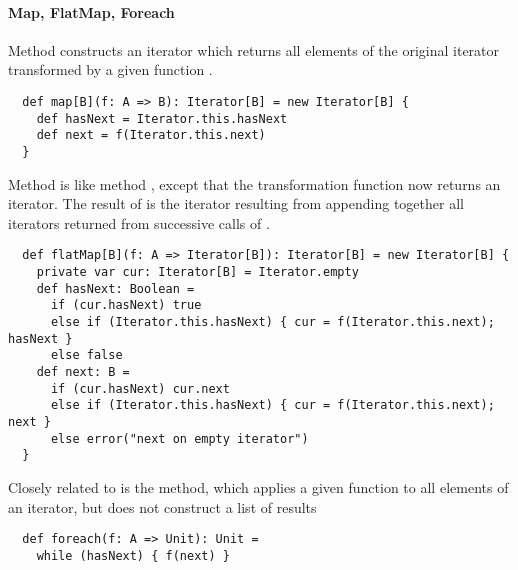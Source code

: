 {\paragraph{Map, FlatMap, Foreach} Method  
constructs an iterator which returns all elements of the original
iterator transformed by a given function .
\begin{lstlisting}
  def map[B](f: A => B): Iterator[B] = new Iterator[B] {
    def hasNext = Iterator.this.hasNext
    def next = f(Iterator.this.next)
  }
\end{lstlisting}
Method  is like method , except that the
transformation function  now returns an iterator.
The result of  is the iterator resulting from appending
together all iterators returned from successive calls of .
\begin{lstlisting}
  def flatMap[B](f: A => Iterator[B]): Iterator[B] = new Iterator[B] {
    private var cur: Iterator[B] = Iterator.empty
    def hasNext: Boolean =
      if (cur.hasNext) true
      else if (Iterator.this.hasNext) { cur = f(Iterator.this.next); hasNext }
      else false
    def next: B =
      if (cur.hasNext) cur.next
      else if (Iterator.this.hasNext) { cur = f(Iterator.this.next); next }
      else error("next on empty iterator")
  }
\end{lstlisting}
Closely related to  is the  method, which
applies a given function to all elements of an iterator, but does not
construct a list of results
\begin{lstlisting}
  def foreach(f: A => Unit): Unit =
    while (hasNext) { f(next) }
\end{lstlisting}

}

